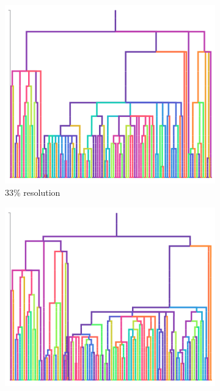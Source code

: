 \begin{figure}
  \centering
  \begin{subfigure}[b]{\linewidth}
    \centering
    \includegraphics[width=\textwidth, height=0.16\textheight]{img/plain_resolution_3}
    \caption{33\% resolution}
    \label{fig:perfect-tree-phylometrics-sensitivity-analysis:epoch0}
  \end{subfigure}
  \begin{subfigure}[b]{\linewidth}
    \centering
    \includegraphics[width=\textwidth, height=0.16\textheight]{img/plain_resolution_10}

\end{subfigure}
\end{figure}

